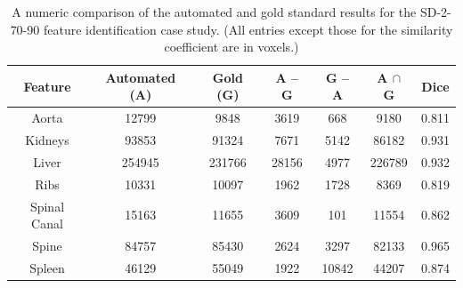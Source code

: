 \begin{table}[p]
\begin{center}
\begin{tabular}{c|cccccc}
\footnotesize \textbf{Feature} & \footnotesize \textbf{Automated (A)} & \footnotesize \textbf{Gold (G)} & \footnotesize \textbf{A -- G} & \footnotesize \textbf{G -- A} & \footnotesize \textbf{A $\cap$ G} & \footnotesize \textbf{Dice} \\
\hline
\footnotesize Aorta & \footnotesize 12799 & \footnotesize 9848 & \footnotesize 3619 & \footnotesize 668 & \footnotesize 9180 & \footnotesize 0.811 \\
\footnotesize Kidneys & \footnotesize 93853 & \footnotesize 91324 & \footnotesize 7671 & \footnotesize 5142 & \footnotesize 86182 & \footnotesize 0.931 \\
\footnotesize Liver & \footnotesize 254945 & \footnotesize 231766 & \footnotesize 28156 & \footnotesize 4977 & \footnotesize 226789 & \footnotesize 0.932 \\
\footnotesize Ribs & \footnotesize 10331 & \footnotesize 10097 & \footnotesize 1962 & \footnotesize 1728 & \footnotesize 8369 & \footnotesize 0.819 \\
\footnotesize Spinal Canal & \footnotesize 15163 & \footnotesize 11655 & \footnotesize 3609 & \footnotesize 101 & \footnotesize 11554 & \footnotesize 0.862 \\
\footnotesize Spine & \footnotesize 84757 & \footnotesize 85430 & \footnotesize 2624 & \footnotesize 3297 & \footnotesize 82133 & \footnotesize 0.965 \\
\footnotesize Spleen & \footnotesize 46129 & \footnotesize 55049 & \footnotesize 1922 & \footnotesize 10842 & \footnotesize 44207 & \footnotesize 0.874 \\
\end{tabular}
\end{center}
\caption{A numeric comparison of the automated and gold standard results for the SD-2-70-90 feature identification case study. (All entries except those for the similarity coefficient are in voxels.)}
\label{tbl:validation-SD-2-70-90}
\end{table}

